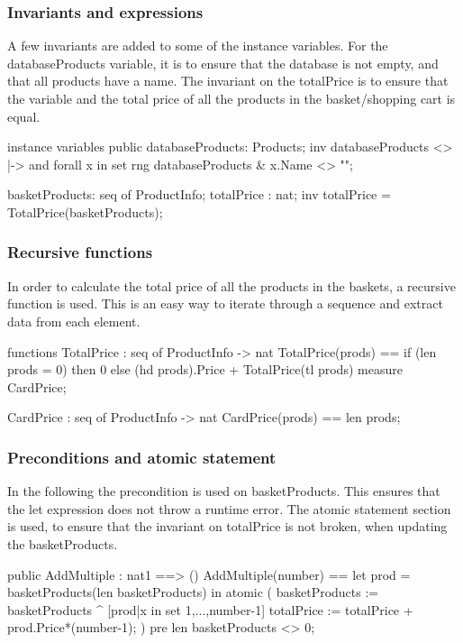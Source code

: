 \subsubsection{Invariants and expressions}
A few invariants are added to some of the instance variables. For the databaseProducts variable, it is to ensure that the database is not empty, and that all products have a name.
The invariant on the totalPrice is to ensure that the variable and the total price of all the products in the basket/shopping cart is equal.
\begin{vdmpp}
instance variables
 public databaseProducts: Products;
  inv databaseProducts <> {|->} and 
   forall x in set rng databaseProducts &
    x.Name <> "";
   
 basketProducts: seq of ProductInfo;
 totalPrice : nat;
  inv totalPrice = TotalPrice(basketProducts); 
\end{vdmpp}

\newpage
\subsubsection{Recursive functions}
In order to calculate the total price of all the products in the baskets, a recursive function is used. This is an easy way to iterate through a sequence and extract data from each element.
\begin{vdmpp}
functions
 TotalPrice : seq of ProductInfo -> nat
 TotalPrice(prods) == 
  if (len prods = 0) then
   0
  else
   (hd prods).Price + TotalPrice(tl prods)
  measure CardPrice;
  
 CardPrice : seq of ProductInfo -> nat
 CardPrice(prods) ==
  len prods; 
  
\end{vdmpp}

\subsubsection{Preconditions and atomic statement}
In the following the precondition is used on basketProducts. This ensures that the let expression does not throw a runtime error.
The atomic statement section is used, to ensure that the invariant on totalPrice is not broken, when updating the basketProducts. 
\begin{vdmpp}
 public AddMultiple : nat1 ==> ()
 AddMultiple(number) == 
  let prod = basketProducts(len basketProducts) 
   in  
    atomic
    (
      basketProducts := basketProducts ^ [prod|x in set {1,...,number-1}]
      totalPrice := totalPrice + prod.Price*(number-1);
    )
  pre len basketProducts <> 0;
\end{vdmpp}

